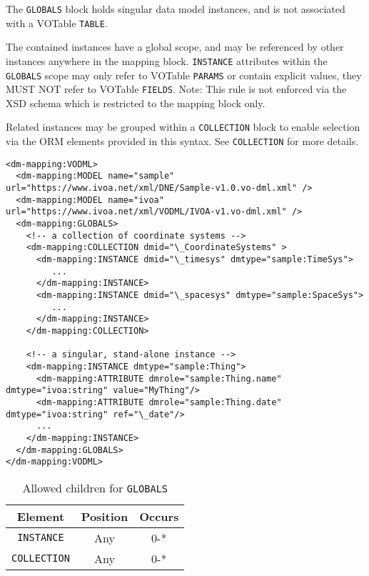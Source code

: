 The \texttt{GLOBALS} block holds singular data model instances, and is not associated 
with a VOTable \texttt{TABLE}.

The contained instances have a global scope, and may be
referenced by other instances anywhere in the mapping block.  \texttt{INSTANCE} attributes
within the \texttt{GLOBALS} scope may only refer to VOTable \texttt{PARAMS} or contain
explicit values, they MUST NOT refer to VOTable \texttt{FIELDS}.  Note: This rule is not enforced
via the XSD schema which is restricted to the mapping block only.

Related instances may be grouped within a \texttt{COLLECTION} block to enable selection
via the ORM elements provided in this syntax.  See \texttt{COLLECTION} for more details.

\begin{lstlisting}[frame=single,caption={Example \texttt{GLOBALS} block},style=XML,basicstyle=\tiny]
<dm-mapping:VODML>
  <dm-mapping:MODEL name="sample" url="https://www.ivoa.net/xml/DNE/Sample-v1.0.vo-dml.xml" />
  <dm-mapping:MODEL name="ivoa"   url="https://www.ivoa.net/xml/VODML/IVOA-v1.vo-dml.xml" />
  <dm-mapping:GLOBALS>
    <!-- a collection of coordinate systems -->
    <dm-mapping:COLLECTION dmid="\_CoordinateSystems" >
      <dm-mapping:INSTANCE dmid="\_timesys" dmtype="sample:TimeSys">
         ...
      </dm-mapping:INSTANCE>
      <dm-mapping:INSTANCE dmid="\_spacesys" dmtype="sample:SpaceSys">
         ...
      </dm-mapping:INSTANCE>
    </dm-mapping:COLLECTION>

    <!-- a singular, stand-alone instance -->
    <dm-mapping:INSTANCE dmtype="sample:Thing">
      <dm-mapping:ATTRIBUTE dmrole="sample:Thing.name" dmtype="ivoa:string" value="MyThing"/>
      <dm-mapping:ATTRIBUTE dmrole="sample:Thing.date" dmtype="ivoa:string" ref="\_date"/>
      ...
    </dm-mapping:INSTANCE>
  </dm-mapping:GLOBALS>
</dm-mapping:VODML>
\end{lstlisting}


\begin{table}[!htbp]
  \small
  \centering
  \begin{tabulary}{\linewidth}{|c |c |c|}
    \hline 
        \textbf{Element} &
        \textbf{Position} &
        \textbf{Occurs}\\
    \hline
    \hline
        \texttt{INSTANCE} &
        Any &
        0-*\\
    \hline
        \texttt{COLLECTION} &
        Any &
        0-*\\
    \hline
  \end{tabulary}
  \caption{Allowed children for \texttt{GLOBALS}} 
  \label{tbl:globals-children}
 \end{table}
